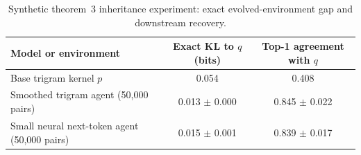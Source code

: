 \begin{table}[t]
\centering
\footnotesize
\caption{Synthetic theorem~3 inheritance experiment: exact evolved-environment gap and downstream recovery.}
\label{tab:appx-theorem3-cross-entropy}
\begin{tabular}{lcc}
\toprule
Model or environment & Exact KL to $q$ (bits) & Top-1 agreement with $q$ \\
\midrule
Base trigram kernel $p$ & 0.054 & 0.408 \\
Smoothed trigram agent (50,000 pairs) & 0.013 $\pm$ 0.000 & 0.845 $\pm$ 0.022 \\
Small neural next-token agent (50,000 pairs) & 0.015 $\pm$ 0.001 & 0.839 $\pm$ 0.017 \\
\bottomrule
\end{tabular}
\end{table}
